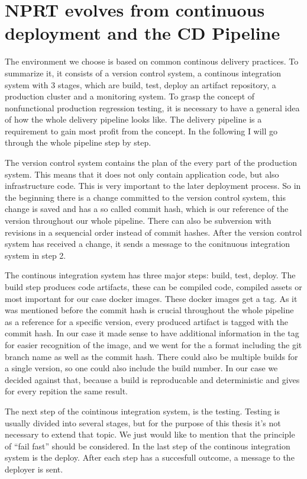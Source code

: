 \section{NPRT evolves from continuous deployment and the CD Pipeline}

The environment we choose is based on common continous delivery practices. To summarize it, it consists of a version control system, a continous integration system with 3 stages, which are build, test, deploy an artifact repository, a production cluster and a monitoring system. To grasp the concept of nonfunctional production regression testing, it is necessary to have a general idea of how the whole delivery pipeline looks like. The delivery pipeline is a requirement to gain most profit from the concept. In the following I will go through the whole pipeline step by step.

The version control system contains the plan of the every part of the production system. This means that it does not only contain application code, but also infrastructure code. This is very important to the later deployment process. So in the beginning there is a change committed to the version control system, this change is saved and has a so called commit hash, which is our reference of the version throughout our whole pipeline. There can also be subversion with revisions in a sequencial order instead of commit hashes. After the version control system has received a change, it sends a message to the conitnuous integration system in step 2.

The continous integration system has three major steps: build, test, deploy. The build step produces code artifacts, these can be compiled code, compiled assets or most important for our case docker images. These docker images get a tag. As it was mentioned before the commit hash is crucial throughout the whole pipeline as a reference for a specific version, every produced artifact is tagged with the commit hash. In our case it made sense to have additional information in the tag for easier recognition of the image, and we went for the a format including the git branch name as well as the commit hash. There could also be multiple builds for a single version, so one could also include the build number. In our case we decided against that, because a build is reproducable and deterministic and gives for every repition the same result.

The next step of the cointinous integration system, is the testing. Testing is usually divided into several stages, but for the purpose of this thesis it's not necessary to extend that topic. We just would like to mention that the principle of ``fail fast'' should be considered. In the last step of the continous integration system is the deploy. After each step has a succesfull outcome, a message to the deployer is sent.

